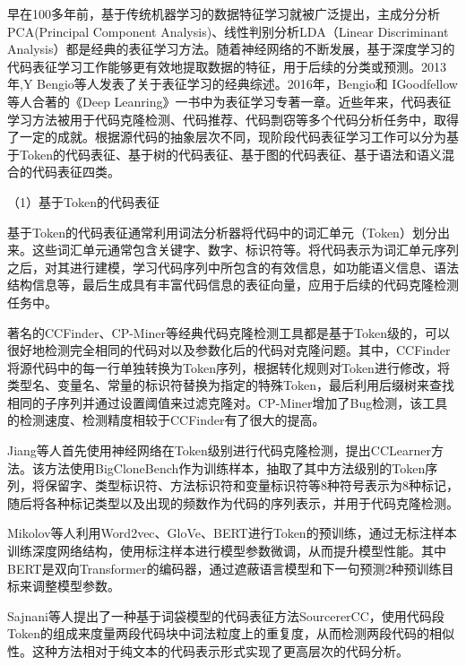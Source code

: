 早在100多年前，基于传统机器学习的数据特征学习就被广泛提出\cite{wiki}，主成分分析PCA(Principal Component Analysis)\cite{WOS:000202849800065}、线性判别分析LDA（Linear Discriminant Analysis）\cite{2012THE}都是经典的表征学习方法。随着神经网络的不断发展，基于深度学习的代码表征学习工作能够更有效地提取数据的特征，用于后续的分类或预测。2013年,Y Bengio等人\cite{Bengio2013Representation}发表了关于表征学习的经典综述。2016年，Bengio和 IGoodfellow等人\cite{goodfellow2016deep}合著的《Deep Leanring》一书中为表征学习专著一章。近些年来，代码表征学习方法被用于代码克隆检测、代码推荐、代码剽窃等多个代码分析任务中，取得了一定的成就。根据源代码的抽象层次不同，现阶段代码表征学习工作可以分为基于Token的代码表征、基于树的代码表征、基于图的代码表征、基于语法和语义混合的代码表征四类。

（1）基于Token的代码表征

基于Token的代码表征通常利用词法分析器将代码中的词汇单元（Token）划分出来。这些词汇单元通常包含关键字、数字、标识符等。将代码表示为词汇单元序列之后，对其进行建模，学习代码序列中所包含的有效信息，如功能语义信息、语法结构信息等，最后生成具有丰富代码信息的表征向量，应用于后续的代码克隆检测任务中。

著名的CCFinder\cite{1019480}、CP-Miner\cite{1610609}等经典代码克隆检测工具都是基于Token级的，可以很好地检测完全相同的代码对以及参数化后的代码对克隆问题。其中，CCFinder将源代码中的每一行单独转换为Token序列，根据转化规则对Token进行修改，将类型名、变量名、常量的标识符替换为指定的特殊Token，最后利用后缀树来查找相同的子序列并通过设置阈值来过滤克隆对。CP-Miner增加了Bug检测，该工具的检测速度、检测精度相较于CCFinder有了很大的提高。

Jiang等人\cite{10.1145/1287624.1287634}首先使用神经网络在Token级别进行代码克隆检测，提出CCLearner方法。该方法使用BigCloneBench\cite{7332459}作为训练样本，抽取了其中方法级别的Token序列，将保留字、类型标识符、方法标识符和变量标识符等8种符号表示为8种标记，随后将各种标记类型以及出现的频数作为代码的序列表示，并用于代码克隆检测。

Mikolov等人\cite{pennington-etal-2014-glove}利用Word2vec、GloVe、BERT进行Token的预训练，通过无标注样本训练深度网络结构，使用标注样本进行模型参数微调，从而提升模型性能。其中BERT\cite{devlin-etal-2019-bert}是双向Transformer的编码器，通过遮蔽语言模型和下一句预测2种预训练目标来调整模型参数。

Sajnani等人\cite{7886988}提出了一种基于词袋模型的代码表征方法SourcererCC，使用代码段Token的组成来度量两段代码块中词法粒度上的重复度，从而检测两段代码的相似性。这种方法相对于纯文本的代码表示形式实现了更高层次的代码分析。

